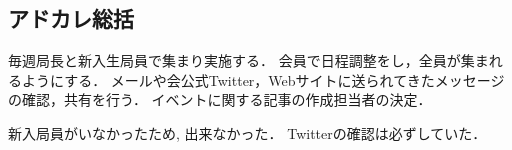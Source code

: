 \subsection*{アドカレ総括}


毎週局長と新入生局員で集まり実施する．
会員で日程調整をし，全員が集まれるようにする．
メールや会公式Twitter，Webサイトに送られてきたメッセージの確認，共有を行う．
イベントに関する記事の作成担当者の決定．


新入局員がいなかったため, 出来なかった．
Twitterの確認は必ずしていた．
